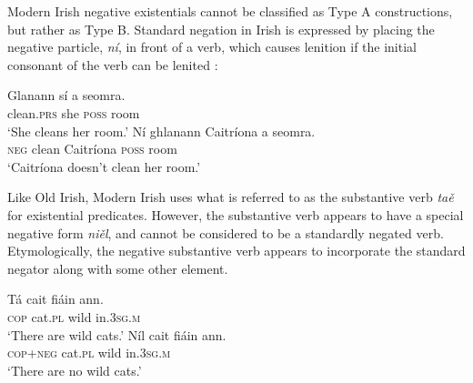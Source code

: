 \documentclass[output=paper,colorlinks,citecolor=brown]{langscibook}
\begin{document}
Modern Irish negative existentials cannot be classified as
Type A constructions, but rather as Type B. Standard negation in
Irish is expressed by placing the negative particle, \textit{ní}, in front of a verb, which causes lenition if the initial consonant of the verb can be lenited \citep[86]{Stenson2008}:
%
\begin{exe}\ex
{}
\begin{xlist}
\ex \gll Glanann sí a seomra. \\
clean.\textsc{prs}  she \textsc{poss} room \\
    \glt `She cleans her room.' 
\ex\gll Ní ghlanann Caitríona a seomra.\\
\textsc{neg} clean        Caitríona  \textsc{poss} room\\
\glt `Caitríona doesn't clean her room.' 
\end{xlist}\end{exe}
%
Like Old Irish, Modern Irish uses what is referred to as the substantive verb \textit{taě} for existential predicates. However, the substantive verb appears to have a special negative form \textit{niěl}, and cannot be considered to be a standardly negated verb. Etymologically, the negative substantive verb appears to incorporate the standard negator along with some other element. 
%
\begin{exe}\ex
{}
\begin{xlist}
\ex \gll Tá cait fiáin ann. \\
    \textsc{cop} cat.\textsc{pl} wild in.\textsc{3sg}.\textsc{m} \\
    \glt `There are wild cats.'
\ex\gll Níl cait fiáin ann.\\
    \textsc{cop}+\textsc{neg} cat.\textsc{pl} wild in.\textsc{3sg.m}\\
    \glt `There are no wild cats.'
\end{xlist}\end{exe}
\end{document}
